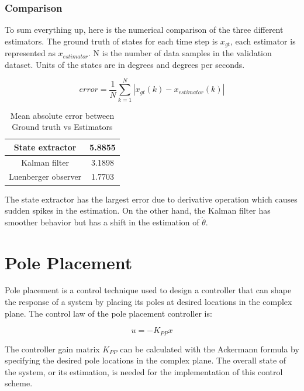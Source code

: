 
\subsubsection{Comparison}

To sum everything up, here is the numerical comparison of the three different estimators. The ground truth of states for each time step is $x_{gt}$, each estimator is represented as $x_{estimator}$. N is the number of data samples in the validation dataset. Units of the states are in degrees and degrees per seconds.

    \[
    error =\frac{1}{N}\sum_{k=1}^{N} \left|x_{gt}(k) - x_{estimator}(k)\right|
        \]

\begin{table}[ht]

    \centering
    \caption{Mean absolute error between Ground truth vs Estimators}
    \begin{tabular}{|c|c|} 
    \hline
    State extractor & 5.8855\\ 
    \hline
    Kalman filter & 3.1898\\
    \hline
    Luenberger observer & 1.7703 \\ 
    
 \hline
    \end{tabular}
\end{table}
The state extractor has the largest error due to derivative operation which causes sudden spikes in the estimation. On the other hand, the Kalman filter has smoother behavior but has a shift in the estimation of $\dot\theta$.


\section{Pole Placement}
Pole placement is a control technique used to design a controller that can shape the response of a system by placing its poles at desired locations in the complex plane.
The control law of the pole placement controller is:

\begin{equation*}
    u = -K_{PP}x
\end{equation*}

The controller gain matrix $K_{PP}$ can be calculated with the Ackermann formula by specifying the desired pole locations in the complex plane.
The overall state of the system, or its estimation, is needed for the implementation of this control scheme.
